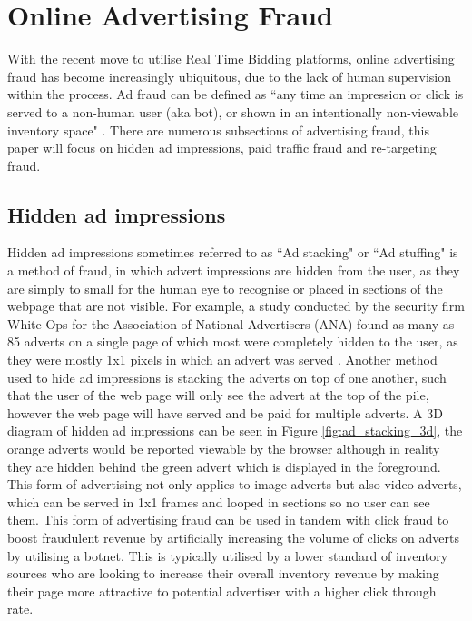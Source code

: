 \documentclass[12pt]{article}
\begin{document}
\pagebreak

\section{Online Advertising Fraud} \label{adFraud}
With the recent move to utilise Real Time Bidding platforms, online advertising fraud has become increasingly ubiquitous, due to the lack of human supervision within the process. Ad fraud can be defined as ``any time an impression or click is served to a non-human user (aka bot), or shown in an intentionally non-viewable inventory space" \parencite{dstillery}. There are numerous subsections of advertising fraud, this paper will focus on hidden ad impressions, paid traffic fraud and re-targeting fraud.   


\subsection{Hidden ad impressions}
Hidden ad impressions sometimes referred to as ``Ad stacking" or ``Ad stuffing" is a method of fraud, in which advert impressions are hidden from the user, as they are simply to small for the human eye to recognise or placed in sections of the webpage that are not visible. For example, a study conducted by the security firm White Ops for the Association of National Advertisers (ANA) found as many as 85 adverts on a single page of which most were completely hidden to the user, as they were mostly 1x1 pixels in which an advert was served \parencite{botfraud2015}. Another method used to hide ad impressions is stacking the adverts on top of one another, such that the user of the web page will only see the advert at the top of the pile, however the web page will have served and be paid for multiple adverts. A 3D diagram of hidden ad impressions can be seen in Figure \ref{fig:ad_stacking_3d}, the orange adverts would be reported viewable by the browser although in reality they are hidden behind the green advert which is displayed in the foreground.  \\

This form of advertising not only applies to image adverts but also video adverts, which can be served in 1x1 frames and looped in sections so no user can see them. This form of advertising fraud can be used in tandem with click fraud to boost fraudulent revenue by artificially increasing the volume of clicks on adverts by utilising a botnet. This is typically utilised by a lower standard of inventory sources who are looking to increase their overall inventory revenue by making their page more attractive to potential advertiser with a higher click through rate.   \\
\end{document}
